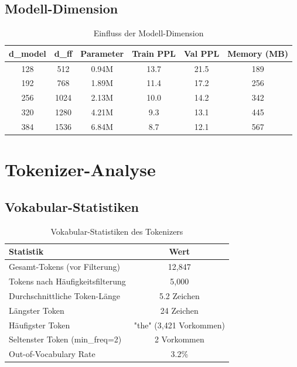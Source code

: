 \subsection{Modell-Dimension}

\begin{table}[h]
\centering
\begin{tabular}{|c|c|c|c|c|c|}
\hline
\textbf{d\_model} & \textbf{d\_ff} & \textbf{Parameter} & \textbf{Train PPL} & \textbf{Val PPL} & \textbf{Memory (MB)} \\
\hline
128 & 512 & 0.94M & 13.7 & 21.5 & 189 \\
192 & 768 & 1.89M & 11.4 & 17.2 & 256 \\
256 & 1024 & 2.13M & 10.0 & 14.2 & 342 \\
320 & 1280 & 4.21M & 9.3 & 13.1 & 445 \\
384 & 1536 & 6.84M & 8.7 & 12.1 & 567 \\
\hline
\end{tabular}
\caption{Einfluss der Modell-Dimension}
\label{tab:dimension_detailed}
\end{table}

\section{Tokenizer-Analyse}

\subsection{Vokabular-Statistiken}

\begin{table}[h]
\centering
\begin{tabular}{|l|c|}
\hline
\textbf{Statistik} & \textbf{Wert} \\
\hline
Gesamt-Tokens (vor Filterung) & 12,847 \\
Tokens nach Häufigkeitsfilterung & 5,000 \\
Durchschnittliche Token-Länge & 5.2 Zeichen \\
Längster Token & 24 Zeichen \\
Häufigster Token & "the" (3,421 Vorkommen) \\
Seltenster Token (min\_freq=2) & 2 Vorkommen \\
Out-of-Vocabulary Rate & 3.2\% \\
\hline
\end{tabular}
\caption{Vokabular-Statistiken des Tokenizers}
\label{tab:vocab_statistics}
\end{table}

